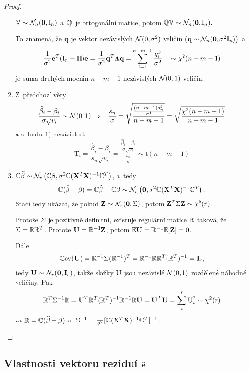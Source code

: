 \begin{proof}
\begin{enumerate}
\begin{theorem}
	 $\mathbb{V} \sim \mathcal{N}_n (\boldsymbol{0}, \mathbb{I}_{n})$ a~$\mathbb{Q}$ je ortogonální matice, potom $\mathbb{Q} \mathbb{V} \sim \mathcal{N}_n (\boldsymbol{0}, \mathbb{I}_{n}).$
\end{theorem}
\vspace{0.1cm}
To znamená, že $\textbf{q}$ je vektor nezávislých $\mathcal{N}(0,\sigma^2)$ veličin $\left(\textbf{q} \sim \mathcal{N}_n (\boldsymbol{0}, \sigma^2 \mathbb{I}_{n})\right)$ a
 $$ \frac{1}{\sigma^2} \mathbf{e}^T (\text{I}_n - \mathbb{H}) \mathbf{e} = \frac{1}{\sigma^2} \textbf{q}^T \mathbf{\Lambda} \textbf{q} = \sum_{i = 1}^{n-m-1}\frac{q_i^2}{\sigma^2} \quad \sim \chi^2 (n - m - 1) $$
je suma druhých mocnin $n-m-1$ nezávislých $\mathcal{N}(0,1)$ veličin.
\item Z~předchozí věty:
 $$
  \frac{\widehat{\beta}_i - \beta_i}{\sigma \sqrt{v_i}} \sim \mathcal{N}(0,1) \quad \text{a} \quad \frac{s_n}{\sigma} = \sqrt{\frac{\frac{(n-m-1) s_n^2}{\sigma^2}}{n-m-1}} = \sqrt{\frac{\chi^2(n-m-1)}{n-m-1}}
 $$
a z~bodu $1)$ nezávislost
\begin{equation}
  \text{T}_i = \frac{\widehat{\beta}_i - \beta_i}{s_n \sqrt{v_i}} = \frac{\frac{\widehat{\beta}_i - \beta_i}{\sigma \sqrt{v_i}}}{\frac{s_n}{\sigma}} \sim \mathrm{t}(n-m-1)
\label{Rozdeleni_T}
\end{equation}
\item
 $\mathbb{C} \widehat{\beta} \sim \mathcal{N}_r \left(\mathbb{C} \beta, \sigma^2 \mathbb{C} (\mathbf{X}^T \mathbf{X})^{-1} \mathbb{C}^T \right)$, a~tedy
 $$ \mathbb{C} (\widehat{\beta} - \beta) = \mathbb{C}\widehat{\beta} - \mathbb{C} \beta \sim \mathcal{N}_r \left(\boldsymbol{0}, \sigma^2 \mathbb{C} (\mathbf{X}^T \mathbf{X})^{-1} \mathbb{C}^T\right). $$
Stačí tedy ukázat, že pokud $\mathbf{Z} \sim \mathcal{N}_r (\boldsymbol{0}, \Sigma)$, potom $\mathbf{Z}^T \Sigma \mathbf{Z} \sim \chi^2(r)$.

Protože $\Sigma$ je pozitivně definitní, existuje regulární matice $\mathbb{R}$ taková, že $\Sigma = \mathbb{R}\mathbb{R}^T$. Protože $\textbf{U} = \mathbb{R}^{-1} \mathbf{Z}$, potom $\mathbb{E} \textbf{U} = \mathbb{R}^{-1} \mathbb{E} [\mathbf{Z}] = 0$.

Dále
$$\mathbb{C}\mathrm{ov}(\textbf{U}) = \mathbb{R}^{-1} \Sigma (\mathbb{R}^{-1})^T = \mathbb{R}^{-1} \mathbb{R}\mathbb{R}^T (\mathbb{R}^T)^{-1} = \textbf{I}_r,$$
 tedy $\textbf{U} \sim \mathcal{N}_r (\boldsymbol{0}, \textbf{I}_r)$, takže složky \textbf{U} jsou nezávislé $\mathcal{N}(0,1)$ rozdělené náhodné veličiny. Pak
 $$ \mathbb{R}^T \Sigma^{-1} \mathbb{R} = \textbf{U}^T \mathbb{R}^T (\mathbb{R}^T)^{-1} \mathbb{R}^{-1} \mathbb{R} \textbf{U} = \textbf{U}^T \textbf{U} = \sum_i^r \text{U}_i^2 \sim \chi^2(r) $$
za $\mathbb{R} = \mathbb{C} (\widehat{\beta} - \beta)$ a~$\Sigma^{-1} = \frac{1}{\sigma^2} [\mathbb{C} (\mathbf{X}^T \mathbf{X})^{-1} \mathbb{C}^T]^{-1}$.

\end{enumerate}
\end{proof}

\subsection{Vlastnosti vektoru reziduí $\widehat{\mathbf{e}}$ }

